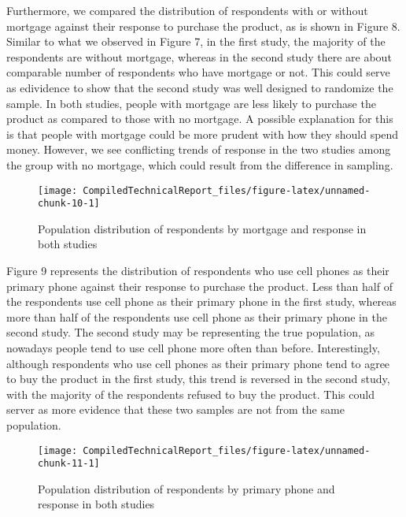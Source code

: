 \documentclass[]{article}
\begin{document}
\newpage

Furthermore, we compared the distribution of respondents with or without
mortgage against their response to purchase the product, as is shown in
Figure 8. Similar to what we observed in Figure 7, in the first study,
the majority of the respondents are without mortgage, whereas in the
second study there are about comparable number of respondents who have
mortgage or not. This could serve as edividence to show that the second
study was well designed to randomize the sample. In both studies, people
with mortgage are less likely to purchase the product as compared to
those with no mortgage. A possible explanation for this is that people
with mortgage could be more prudent with how they should spend money.
However, we see conflicting trends of response in the two studies among
the group with no mortgage, which could result from the difference in
sampling.

\begin{figure}

{\centering \texttt{[image: CompiledTechnicalReport\_files/figure-latex/unnamed-chunk-10-1]} 

}

\caption{Population distribution of respondents by mortgage and response in both studies}\label{fig:unnamed-chunk-10}
\end{figure}

Figure 9 represents the distribution of respondents who use cell phones
as their primary phone against their response to purchase the product.
Less than half of the respondents use cell phone as their primary phone
in the first study, whereas more than half of the respondents use cell
phone as their primary phone in the second study. The second study may
be representing the true population, as nowadays people tend to use cell
phone more often than before. Interestingly, although respondents who
use cell phones as their primary phone tend to agree to buy the product
in the first study, this trend is reversed in the second study, with the
majority of the respondents refused to buy the product. This could
server as more evidence that these two samples are not from the same
population.

\begin{figure}

{\centering \texttt{[image: CompiledTechnicalReport\_files/figure-latex/unnamed-chunk-11-1]} 

}

\caption{Population distribution of respondents by primary phone and response in both studies}\label{fig:unnamed-chunk-11}
\end{figure}
\end{document}
